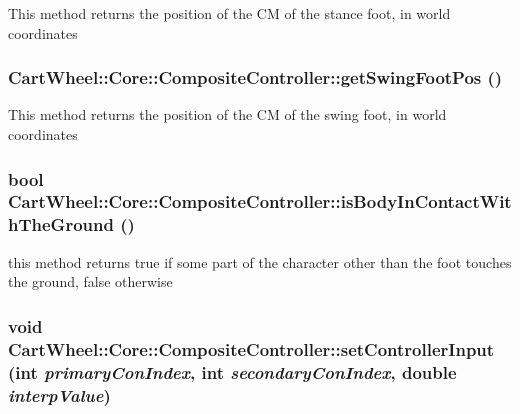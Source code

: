 \label{classCartWheel_1_1Core_1_1CompositeController_ac9116608597803a4adf905f78670f621}
This method returns the position of the CM of the stance foot, in world coordinates \hypertarget{classCartWheel_1_1Core_1_1CompositeController_a3e436fc94001645ccfc699513260a25b}{
\subsubsection[{getSwingFootPos}]{ CartWheel::Core::CompositeController::getSwingFootPos ()}}
\label{classCartWheel_1_1Core_1_1CompositeController_a3e436fc94001645ccfc699513260a25b}
This method returns the position of the CM of the swing foot, in world coordinates \hypertarget{classCartWheel_1_1Core_1_1CompositeController_a8c22faef393c4b88522a3d60cc55d8d8}{
\subsubsection[{isBodyInContactWithTheGround}]{\setlength{\rightskip}{0pt plus 5cm}bool CartWheel::Core::CompositeController::isBodyInContactWithTheGround ()}}
\label{classCartWheel_1_1Core_1_1CompositeController_a8c22faef393c4b88522a3d60cc55d8d8}
this method returns true if some part of the character other than the foot touches the ground, false otherwise \hypertarget{classCartWheel_1_1Core_1_1CompositeController_aa5626576d57b939b33f9db8bb2d81300}{
\subsubsection[{setControllerInput}]{\setlength{\rightskip}{0pt plus 5cm}void CartWheel::Core::CompositeController::setControllerInput (int {\em primaryConIndex}, \/  int {\em secondaryConIndex}, \/  double {\em interpValue})}}
